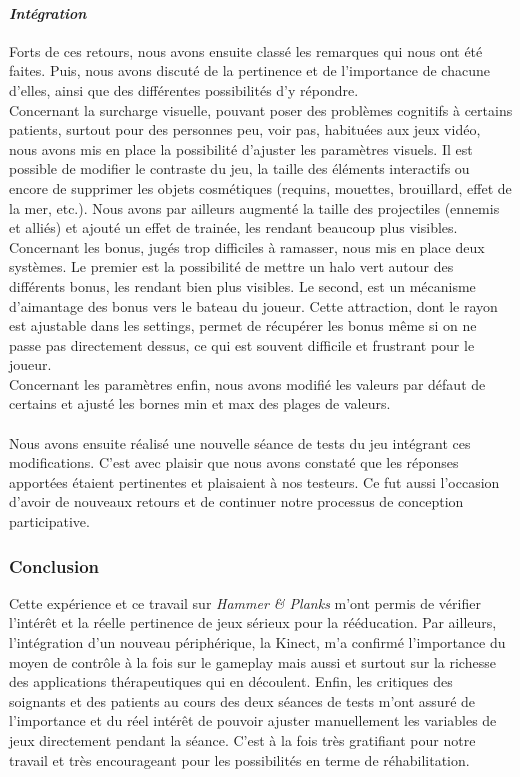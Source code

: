 	\paragraph{\emph{Intégration}\\}
	Forts de ces retours, nous avons ensuite classé les remarques qui nous ont été faites. Puis, nous avons discuté de la pertinence et de l'importance de chacune d'elles, ainsi que des différentes possibilités d'y répondre. \\
	Concernant la surcharge visuelle, pouvant poser des problèmes cognitifs à certains patients, surtout pour des personnes peu, voir pas, habituées aux jeux vidéo, nous avons mis en place la possibilité d'ajuster les paramètres visuels. Il est possible de modifier le contraste du jeu, la taille des éléments interactifs ou encore de supprimer les objets cosmétiques (requins, mouettes, brouillard, effet de la mer, etc.). Nous avons par ailleurs augmenté la taille des projectiles (ennemis et alliés) et ajouté un effet de trainée, les rendant beaucoup plus visibles.\\
	Concernant les bonus, jugés trop difficiles à ramasser, nous mis en place deux systèmes. Le premier est la possibilité de mettre un halo vert autour des différents bonus, les rendant bien plus visibles. Le second, est un mécanisme d'aimantage des bonus vers le bateau du joueur. Cette attraction, dont le rayon est ajustable dans les settings, permet de récupérer les bonus même si on ne passe pas directement dessus, ce qui est souvent difficile et frustrant pour le joueur.\\
Concernant les paramètres enfin, nous avons modifié les valeurs par défaut de certains et ajusté les bornes min et max des plages de valeurs.

		
	\paragraph{} Nous avons ensuite réalisé une nouvelle séance de tests du jeu intégrant ces modifications. C'est avec plaisir que nous avons constaté que les réponses apportées étaient pertinentes et plaisaient à nos testeurs. Ce fut aussi l'occasion d'avoir de nouveaux retours et de continuer notre processus de conception participative.
	
	\subsubsection*{Conclusion}
	Cette expérience et ce travail sur \emph{Hammer \& Planks} m'ont permis de vérifier l'intérêt et la réelle pertinence de jeux sérieux pour la rééducation. Par ailleurs, l'intégration d'un nouveau périphérique, la Kinect, m'a confirmé l'importance du moyen de contrôle à la fois sur le gameplay mais aussi et surtout sur la richesse des applications thérapeutiques qui en découlent. Enfin, les critiques des soignants et des patients au cours des deux séances de tests m'ont assuré de l'importance et du réel intérêt de pouvoir ajuster manuellement les variables de jeux directement pendant la séance. C'est à la fois très gratifiant pour notre travail et très encourageant pour les possibilités en terme de réhabilitation.
	
